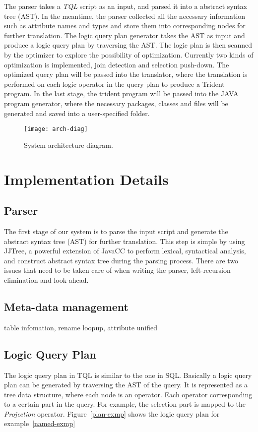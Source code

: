 \documentclass[conference, twocolumn, twoside, 11pt]{IEEEtran}
\theoremstyle{definition}
\begin{document}
The parser takes a \emph{TQL} script as an input, and parsed it into a abstract syntax tree (AST). In the meantime, the parser collected all the necessary information such as attribute names and types and store them into corresponding nodes for further translation. The logic query plan generator takes the AST as input and produce a logic query plan by traversing the AST. The logic plan is then scanned by the optimizer to explore the possibility of optimization. Currently two kinds of optimization is implemented, join detection and selection push-down. The optimized query plan will be passed into the translator, where the translation is performed on each logic operator in the query plan to produce a Trident program. In the last stage, the trident program will be passed into the JAVA program generator, where the necessary packages, classes and files will be generated and saved into a user-specified folder.

\begin{figure}[hbt]
\centering
\texttt{[image: arch-diag]}
\caption{System architecture diagram.}
\label{arch-diag}
\end{figure}

\section{Implementation Details}\label{impl}
\subsection{Parser}
The first stage of our system is to parse the input script and generate the abstract syntax tree (AST) for further translation.
This step is simple by using JJTree, a powerful extension of JavaCC to perform lexical, syntactical analysis, and construct abstract syntax tree during the parsing process. There are two issues that need to be taken care of when writing the parser, left-recursion elimination and look-ahead.

\subsection{Meta-data management}
table infomation, rename loopup, attribute unified
\subsection{Logic Query Plan}
The logic query plan in TQL is similar to the one in SQL. Basically a logic query plan can be generated by traversing the AST of the query. It is represented as a tree data structure, where each node is an operator. Each operator corresponding to a certain part in the query. For example, the selection part is mapped to the \emph{Projection} operator. Figure~\ref{plan-exmp} shows the logic query plan for example~\ref{named-exmp}
\end{document}
